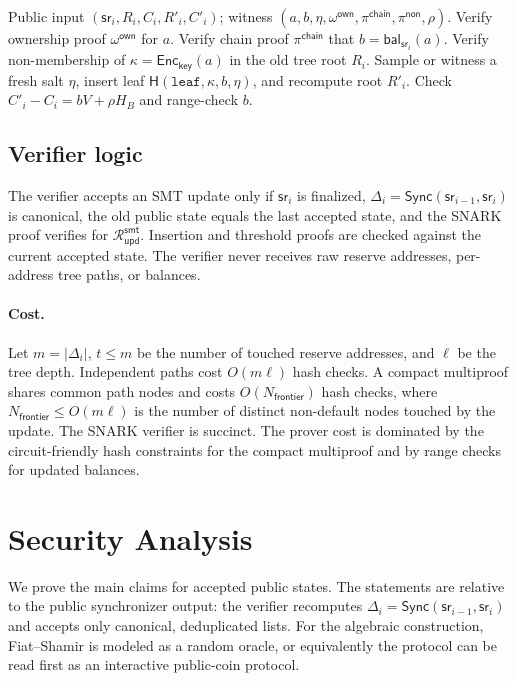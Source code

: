 \documentclass[runningheads]{llncs}
\newcommand{\Enc}{\mathsf{Enc}}
\newcommand{\CRH}{\mathsf{H}}
\newcommand{\bal}{\mathsf{bal}}
\newcommand{\sr}{\mathsf{sr}}
\newcommand{\Sync}{\mathsf{Sync}}
\newcommand{\Rel}{\mathcal{R}}
\newcommand{\dlist}{\Delta}
\begin{document}
\begin{algorithm}[t]
\caption{SMT insertion relation \(\Rel_{\mathsf{ins}}^{\mathsf{smt}}\)}
\begin{algorithmic}[1]
\Require Public input \((\sr_i,R_i,C_i,R'_i,C'_i)\); witness \((a,b,\eta,\omega^{\mathsf{own}},\pi^{\mathsf{chain}},\pi^{\mathsf{non}},\rho)\).
\State Verify ownership proof \(\omega^{\mathsf{own}}\) for \(a\).
\State Verify chain proof \(\pi^{\mathsf{chain}}\) that \(b=\bal_{\sr_i}(a)\).
\State Verify non-membership of \(\kappa=\Enc_{\mathsf{key}}(a)\) in the old tree root \(R_i\).
\State Sample or witness a fresh salt \(\eta\), insert leaf \(\CRH(\mathtt{leaf},\kappa,b,\eta)\), and recompute root \(R'_i\).
\State Check \(C'_i-C_i=bV+\rho H_B\) and range-check \(b\).
\end{algorithmic}
\end{algorithm}

\subsection{Verifier logic}

The verifier accepts an SMT update only if \(\sr_i\) is finalized, \(\dlist_i=\Sync(\sr_{i-1},\sr_i)\) is canonical, the old public state equals the last accepted state, and the SNARK proof verifies for \(\Rel_{\mathsf{upd}}^{\mathsf{smt}}\).  Insertion and threshold proofs are checked against the current accepted state.  The verifier never receives raw reserve addresses, per-address tree paths, or balances.

\paragraph{Cost.}
Let \(m=|\dlist_i|\), \(t\le m\) be the number of touched reserve addresses, and \(\ell\) be the tree depth.  Independent paths cost \(O(m\ell)\) hash checks.  A compact multiproof shares common path nodes and costs \(O(N_{\mathsf{frontier}})\) hash checks, where \(N_{\mathsf{frontier}}\le O(m\ell)\) is the number of distinct non-default nodes touched by the update.  The SNARK verifier is succinct.  The prover cost is dominated by the circuit-friendly hash constraints for the compact multiproof and by range checks for updated balances.


\section{Security Analysis}

We prove the main claims for accepted public states.  The statements are relative to the public synchronizer output: the verifier recomputes \(\dlist_i=\Sync(\sr_{i-1},\sr_i)\) and accepts only canonical, deduplicated lists.  For the algebraic construction, Fiat--Shamir is modeled as a random oracle, or equivalently the protocol can be read first as an interactive public-coin protocol.
\end{document}
